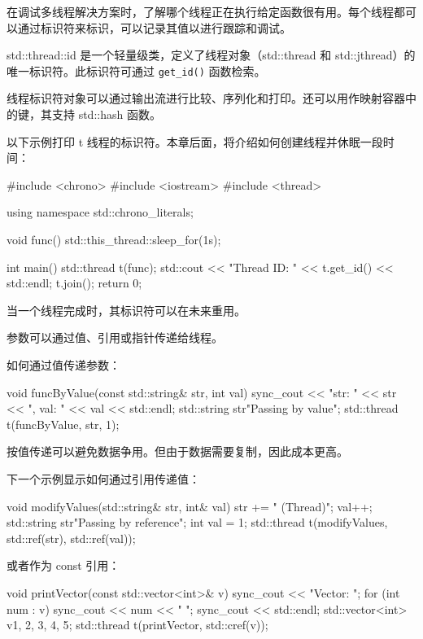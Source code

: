 
在调试多线程解决方案时，了解哪个线程正在执行给定函数很有用。每个线程都可以通过标识符来标识，可以记录其值以进行跟踪和调试。

std::thread::id 是一个轻量级类，定义了线程对象（std::thread 和 std::jthread）的唯一标识符。此标识符可通过 \verb|get_id()| 函数检索。

线程标识符对象可以通过输出流进行比较、序列化和打印。还可以用作映射容器中的键，其支持 std::hash 函数。

以下示例打印 t 线程的标识符。本章后面，将介绍如何创建线程并休眠一段时间：

\begin{cpp}
#include <chrono>
#include <iostream>
#include <thread>

using namespace std::chrono_literals;

void func() {
    std::this_thread::sleep_for(1s);
}

int main() {
    std::thread t(func);
    std::cout << "Thread ID: " << t.get_id() << std::endl;
    t.join();
    return 0;
}
\end{cpp}

当一个线程完成时，其标识符可以在未来重用。


参数可以通过值、引用或指针传递给线程。

如何通过值传递参数：

\begin{cpp}
void funcByValue(const std::string& str, int val) {
    sync_cout << "str: " << str << ", val: " << val
    << std::endl;
}
std::string str{"Passing by value"};
std::thread t(funcByValue, str, 1);
\end{cpp}

按值传递可以避免数据争用。但由于数据需要复制，因此成本更高。

下一个示例显示如何通过引用传递值：

\begin{cpp}
void modifyValues(std::string& str, int& val) {
    str += " (Thread)";
    val++;
}
std::string str{"Passing by reference"};
int val = 1;
std::thread t(modifyValues, std::ref(str), std::ref(val));
\end{cpp}

或者作为 const 引用：

\begin{cpp}
void printVector(const std::vector<int>& v) {
    sync_cout << "Vector: ";
    for (int num : v) {
        sync_cout << num << " ";
    }
    sync_cout << std::endl;
}
std::vector<int> v{1, 2, 3, 4, 5};
std::thread t(printVector, std::cref(v));
\end{cpp}

